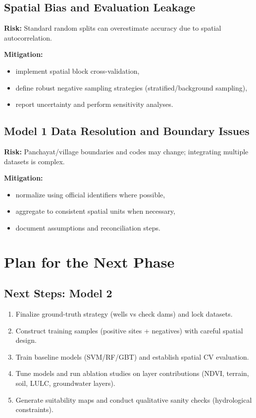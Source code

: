 \documentclass[12pt,a4paper]{report}
\begin{document}
\section{Spatial Bias and Evaluation Leakage}
\textbf{Risk:} Standard random splits can overestimate accuracy due to spatial autocorrelation.

\textbf{Mitigation:}
\begin{itemize}
  \item implement spatial block cross-validation,
  \item define robust negative sampling strategies (stratified/background sampling),
  \item report uncertainty and perform sensitivity analyses.
\end{itemize}

\section{Model 1 Data Resolution and Boundary Issues}
\textbf{Risk:} Panchayat/village boundaries and codes may change; integrating multiple datasets is complex.

\textbf{Mitigation:}
\begin{itemize}
  \item normalize using official identifiers where possible,
  \item aggregate to consistent spatial units when necessary,
  \item document assumptions and reconciliation steps.
\end{itemize}

\chapter{Plan for the Next Phase}
\section{Next Steps: Model 2}
\begin{enumerate}
  \item Finalize ground-truth strategy (wells vs check dams) and lock datasets.
  \item Construct training samples (positive sites + negatives) with careful spatial design.
  \item Train baseline models (SVM/RF/GBT) and establish spatial CV evaluation.
  \item Tune models and run ablation studies on layer contributions (NDVI, terrain, soil, LULC, groundwater layers).
  \item Generate suitability maps and conduct qualitative sanity checks (hydrological constraints).
\end{enumerate}
\end{document}
